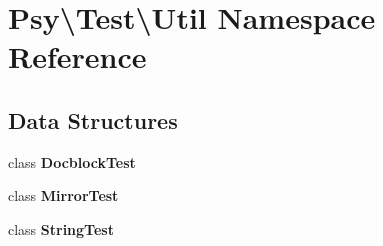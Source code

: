 \section{Psy\textbackslash{}Test\textbackslash{}Util Namespace Reference}
\label{namespace_psy_1_1_test_1_1_util}
\subsection*{Data Structures}
\begin{DoxyCompactItemize}
\item 
class {\bf Docblock\+Test}
\item 
class {\bf Mirror\+Test}
\item 
class {\bf String\+Test}
\end{DoxyCompactItemize}
